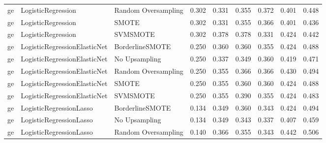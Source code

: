 \begin{tabular}{lllllllll}
      ge &           LogisticRegression & Random Oversampling & 0.302 &                     0.331 &                 0.355 &                  0.372 &                                   0.401 &     0.448 \\
      ge &           LogisticRegression &               SMOTE & 0.302 &                     0.331 &                 0.355 &                  0.366 &                                   0.401 &     0.436 \\
      ge &           LogisticRegression &            SVMSMOTE & 0.302 &                     0.378 &                 0.378 &                  0.331 &                                   0.424 &     0.442 \\
      ge & LogisticRegressionElasticNet &     BorderlineSMOTE & 0.250 &                     0.360 &                 0.360 &                  0.355 &                                   0.424 &     0.488 \\
      ge & LogisticRegressionElasticNet &       No Upsampling & 0.250 &                     0.337 &                 0.349 &                  0.360 &                                   0.419 &     0.471 \\
      ge & LogisticRegressionElasticNet & Random Oversampling & 0.250 &                     0.355 &                 0.366 &                  0.366 &                                   0.430 &     0.494 \\
      ge & LogisticRegressionElasticNet &               SMOTE & 0.250 &                     0.355 &                 0.360 &                  0.360 &                                   0.424 &     0.488 \\
      ge & LogisticRegressionElasticNet &            SVMSMOTE & 0.250 &                     0.355 &                 0.390 &                  0.355 &                                   0.424 &     0.483 \\
      ge &      LogisticRegressionLasso &     BorderlineSMOTE & 0.134 &                     0.349 &                 0.360 &                  0.343 &                                   0.424 &     0.494 \\
      ge &      LogisticRegressionLasso &       No Upsampling & 0.134 &                     0.349 &                 0.343 &                  0.337 &                                   0.407 &     0.459 \\
      ge &      LogisticRegressionLasso & Random Oversampling & 0.140 &                     0.366 &                 0.355 &                  0.343 &                                   0.442 &     0.506 \\

\end{tabular}
